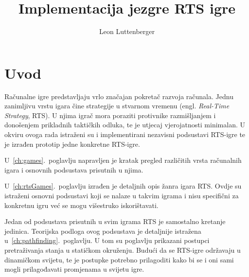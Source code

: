 \documentclass[times, utf8, zavrsni, numeric]{fer}
\begin{document}

\title{Implementacija jezgre RTS igre}

\author{Leon Luttenberger}

\maketitle

\izvornik{}

\zahvala{}

\tableofcontents

\chapter{Uvod}

\par Računalne igre predstavljaju vrlo značajan pokretač razvoja računala.
Jednu zanimljivu vrstu igara čine strategije u stvarnom vremenu (engl. \textit{Real-Time Strategy}, RTS).
U njima igrač mora poraziti protivnike razmišljanjem i donošenjem prikladnih taktičkih odluka, te je utjecaj vjerojatnosti minimalan.
U okviru ovoga rada istraženi su i implementirani nezavisni podsustavi RTS-igre te je izrađen prototip jedne konkretne RTS-igre.

\par U~\ref{ch:games}.~poglavlju napravljen je kratak pregled različitih vrsta računalnih igara i osnovnih podsustava prisutnih u njima.

\par U~\ref{ch:rtsGames}.~poglavlju izrađen je detaljnih opis žanra igara RTS.
Ovdje su istraženi osnovni podsustavi koji se nalaze u takvim igrama i nisu specifični za konkretnu igru već se mogu višestruko iskorištavati.

\par Jedan od podsustava prisutnih u svim igrama RTS je samostalno kretanje jedinica. 
Teorijska podloga ovog podsustava je detaljnije istražena u~\ref{ch:pathfinding}.~poglavlju.
U tom su poglavlju prikazani postupci pretraživanja stanja u statičkom okruženju.
Budući da se RTS-igre održavaju u dinamičkom svijetu, te je postupke potrebno prilagoditi kako bi se i oni sami mogli prilagođavati promjenama u svijetu igre.
\end{document}

